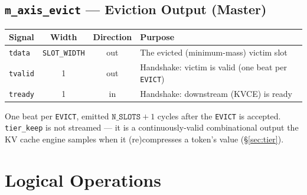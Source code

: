 \documentclass[11pt]{article}
\begin{document}
\subsection{\texttt{m\_axis\_evict} --- Eviction Output (Master)}

\begin{table}[h]
\centering
\small
\begin{tabular}{@{}l c c p{7.2cm}@{}}
\toprule
Signal & Width & Direction & Purpose \\
\midrule
\texttt{tdata}  & \texttt{SLOT\_WIDTH} & out & The evicted (minimum-mass) victim slot \\
\texttt{tvalid} & 1 & out & Handshake: victim is valid (one beat per \texttt{EVICT}) \\
\texttt{tready} & 1 & in  & Handshake: downstream (KVCE) is ready \\
\bottomrule
\end{tabular}
\end{table}

\noindent One beat per \texttt{EVICT}, emitted $\texttt{N\_SLOTS}+1$ cycles after
the \texttt{EVICT} is accepted. \texttt{tier\_keep} is not streamed --- it is a
continuously-valid combinational output the KV cache engine samples when it
(re)compresses a token's value (\S\ref{sec:tier}).

\section{Logical Operations}
\label{sec:ops}
\end{document}
